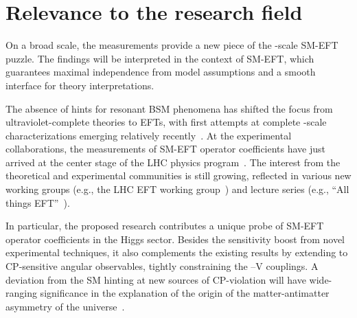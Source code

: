 \documentclass[a4paper,11pt]{article}
\renewcommand{\PV}{{{{V}}}\xspace}
\begin{document}
\section{Relevance to the research field}

On a broad scale, the measurements provide a new piece of the {\TeV}-scale SM-EFT puzzle. 
The findings will be interpreted in the context of SM-EFT, which guarantees maximal independence from model assumptions and a smooth interface for theory interpretations.  

The absence of hints for resonant BSM phenomena has shifted the focus from ultraviolet-complete theories to EFTs, with first attempts at complete {\TeV}-scale characterizations emerging relatively recently~\cite{Ellis:2018gqa,Ellis:2020unq,Ethier:2021bye}.
At the experimental collaborations, the measurements of SM-EFT operator coefficients have just arrived at the center stage of the LHC physics program~\cite{CMS:2021nnc,CMS:2021aly,CMS:2021gme}.
The interest from the theoretical and experimental communities is still growing, reflected in various new working groups (e.g., the  LHC EFT working group~\cite{LHC_EFT_WG}) and lecture series (e.g., ``All things EFT''~\cite{All_EFT}).



In particular, the proposed research contributes a unique probe of SM-EFT operator coefficients in the Higgs sector.
Besides the sensitivity boost from novel experimental techniques, it also complements the existing results by extending to CP-sensitive angular observables, tightly constraining the \PH--\PV couplings.
A deviation from the SM hinting at new sources of CP-violation will have wide-ranging significance in the explanation of the origin of the matter-antimatter asymmetry of the universe~\cite{Cohen:1997ac,Damgaard:2015con,Grzadkowski:2018nbc}.


\end{document}
